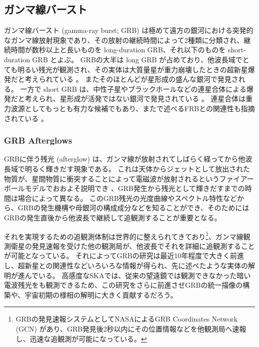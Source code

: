 \subsection{ガンマ線バースト} \label{transients.s1.grb}
ガンマ線バースト (gamma-ray burst; GRB) は極めて遠方の銀河における突発的なガンマ線放射現象であり、その放射の継続時間によって2種類に分類され、継続時間が数秒以上と長いものを long-duration GRB、それ以下のものを short-duration GRB とよぶ。
GRBの大半は long GRB が占めており、他波長域でとても明るい残光が観測され、その実体は大質量星が重力崩壊したときの超新星爆発だと考えられている \citep{2006ARA&A..44..507W}。
またそのほとんどが星形成の盛んな銀河で発見される。
一方で short GRB は、中性子星やブラックホールなどの連星合体による爆発だと考えられ、星形成が活発ではない銀河で発見されている \citep{2007PhR...442..166N}。
連星合体は重力波源としてもっとも有力な候補でもあり、またで述べるFRBとの関連性も指摘されている \citep{2013PASJ...65L..12T}。

\subsubsection{GRB Afterglows}
GRBに伴う残光 (afterglow) は、ガンマ線が放射されてしばらく経ってから他波長域で明るく輝きだす現象である。
これは天体からジェットとして放出された物質が、星間物質に衝突することによって電磁波が放射されるというファイアーボールモデルでおおよそ説明でき \citep{1999PhR...314..575P}、GRB発生から残光として輝きだすまでの時間は場合によって異なる。
このGRB残光の光度曲線やスペクトル特性などから、GRBの発生機構や母銀河の構成成分などを知ることができ、そのためにはGRBの発生直後から他波長で継続して追観測することが重要となる。

それを実現するための追観測体制は世界的に整えられてきており\footnote{GRBの発見速報システムとしてNASAによるGRB Coordinates Network (GCN) があり、GRB発見後2秒以内にその位置情報などを他観測局へ速報し、迅速な追観測が可能になっている。}、ガンマ線観測衛星の発見速報を受けた他の観測局が、他波長でそれを詳細に追観測することが可能となっている。
それによってGRBの研究は最近10年程度で大きく前進し、超新星との関連性などいろいろな情報が得られ、先に述べたような実体の解明が進んでいる。
高感度なSKAでは、従来の望遠鏡では観測できなかった暗い電波残光をも観測できるため、この研究をさらに前進させGRBの統一描像の構築や、宇宙初期の様相の解明に大きく貢献するだろう。

